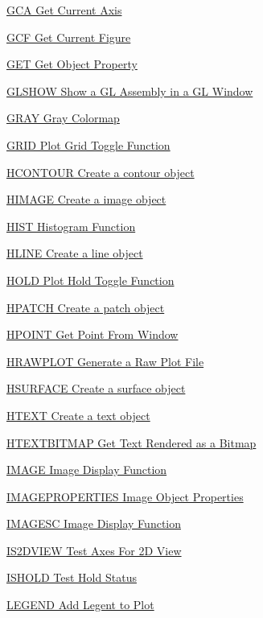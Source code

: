\begin{DoxyItemize}
\item \hyperlink{handle_gca}{G\-C\-A Get Current Axis}  
\item \hyperlink{handle_gcf}{G\-C\-F Get Current Figure}  
\item \hyperlink{handle_get}{G\-E\-T Get Object Property}  
\item \hyperlink{handle_glshow}{G\-L\-S\-H\-O\-W Show a G\-L Assembly in a G\-L Window}  
\item \hyperlink{handle_gray}{G\-R\-A\-Y Gray Colormap}  
\item \hyperlink{handle_grid}{G\-R\-I\-D Plot Grid Toggle Function}  
\item \hyperlink{handle_hcontour}{H\-C\-O\-N\-T\-O\-U\-R Create a contour object}  
\item \hyperlink{handle_himage}{H\-I\-M\-A\-G\-E Create a image object}  
\item \hyperlink{handle_hist}{H\-I\-S\-T Histogram Function}  
\item \hyperlink{handle_hline}{H\-L\-I\-N\-E Create a line object}  
\item \hyperlink{handle_hold}{H\-O\-L\-D Plot Hold Toggle Function}  
\item \hyperlink{handle_hpatch}{H\-P\-A\-T\-C\-H Create a patch object}  
\item \hyperlink{handle_hpoint}{H\-P\-O\-I\-N\-T Get Point From Window}  
\item \hyperlink{handle_hrawplot}{H\-R\-A\-W\-P\-L\-O\-T Generate a Raw Plot File}  
\item \hyperlink{handle_hsurface}{H\-S\-U\-R\-F\-A\-C\-E Create a surface object}  
\item \hyperlink{handle_htext}{H\-T\-E\-X\-T Create a text object}  
\item \hyperlink{handle_htextbitmap}{H\-T\-E\-X\-T\-B\-I\-T\-M\-A\-P Get Text Rendered as a Bitmap}  
\item \hyperlink{handle_image}{I\-M\-A\-G\-E Image Display Function}  
\item \hyperlink{handle_imageproperties}{I\-M\-A\-G\-E\-P\-R\-O\-P\-E\-R\-T\-I\-E\-S Image Object Properties}  
\item \hyperlink{handle_imagesc}{I\-M\-A\-G\-E\-S\-C Image Display Function}  
\item \hyperlink{handle_is2dview}{I\-S2\-D\-V\-I\-E\-W Test Axes For 2\-D View}  
\item \hyperlink{handle_ishold}{I\-S\-H\-O\-L\-D Test Hold Status}  
\item \hyperlink{handle_legend}{L\-E\-G\-E\-N\-D Add Legent to Plot}  

\end{DoxyItemize}
